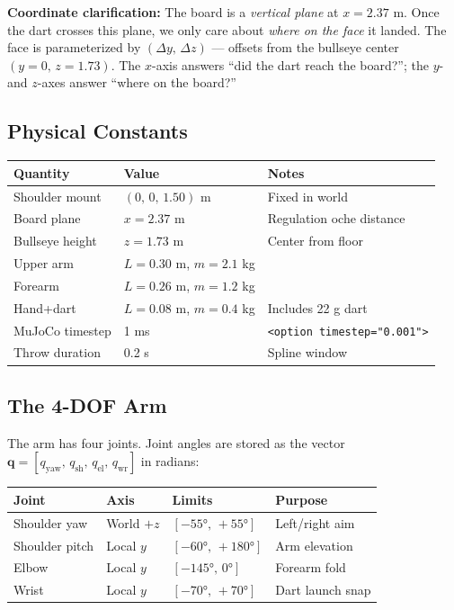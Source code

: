 \documentclass[11pt,letterpaper]{article}
\newcommand{\bq}{\bm{q}}
\begin{document}
\begin{warnbox}
  \textbf{Coordinate clarification:} The board is a \emph{vertical plane} at $x = 2.37$ m. Once the dart crosses this plane, we only care about \emph{where on the face} it landed. The face is parameterized by $(\Delta y,\, \Delta z)$ — offsets from the bullseye center $(y=0,\, z=1.73)$. The $x$-axis answers ``did the dart reach the board?''; the $y$- and $z$-axes answer ``where on the board?''
\end{warnbox}

\subsection{Physical Constants}

\begin{center}
\begin{tabular}{lll}
\toprule
Quantity & Value & Notes \\
\midrule
Shoulder mount & $(0,\,0,\,1.50)$ m & Fixed in world \\
Board plane & $x = 2.37$ m & Regulation oche distance \\
Bullseye height & $z = 1.73$ m & Center from floor \\
Upper arm & $L=0.30$ m, $m=2.1$ kg & \\
Forearm & $L=0.26$ m, $m=1.2$ kg & \\
Hand+dart & $L=0.08$ m, $m=0.4$ kg & Includes 22 g dart \\
MuJoCo timestep & 1 ms & \texttt{<option timestep="0.001">} \\
Throw duration & 0.2 s & Spline window \\
\bottomrule
\end{tabular}
\end{center}

\subsection{The 4-DOF Arm}

The arm has four joints. Joint angles are stored as the vector $\bq = [q_{\text{yaw}},\, q_{\text{sh}},\, q_{\text{el}},\, q_{\text{wr}}]$ in radians:

\begin{center}
\begin{tabular}{llll}
\toprule
Joint & Axis & Limits & Purpose \\
\midrule
Shoulder yaw & World $+z$ & $[-55°,\,+55°]$ & Left/right aim \\
Shoulder pitch & Local $y$ & $[-60°,\,+180°]$ & Arm elevation \\
Elbow & Local $y$ & $[-145°,\,0°]$ & Forearm fold \\
Wrist & Local $y$ & $[-70°,\,+70°]$ & Dart launch snap \\
\bottomrule
\end{tabular}
\end{center}
\end{document}

